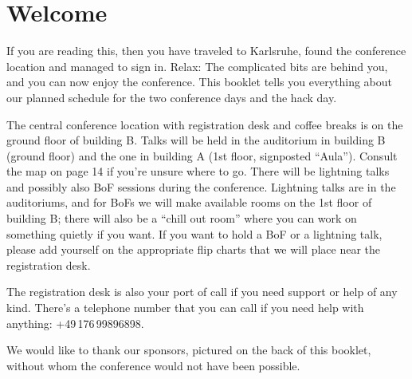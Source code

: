 \newpage
\section*{Welcome} \label{welcome}
\vspace{-0.4em}
If you are reading this, then you have traveled to
Karls\-ruhe, found the conference location and managed to
sign in. Relax: The complicated bits are behind you, and
you can now enjoy the conference.
This booklet tells you everything about our planned
schedule for the two conference days and the hack day.

The central conference location with registration desk and
coffee breaks is on the ground floor of building B. Talks will
be held in the auditorium in building B (ground floor) and
the one in building A (1st floor, signposted ``Aula'').
Consult the map on page 14 if you're unsure where to go.
There will be lightning talks and possibly also BoF sessions
during the conference. Lightning talks are in the
auditoriums, and for BoFs we will make available rooms on
the 1st floor of building B; there will also be a ``chill out
room'' where you can work on something quietly if you
want. If you want to hold a BoF or a lightning talk, please
add yourself on the appropriate flip charts that we will
place near the registration desk.

The registration desk is also your port of call if you need
support or help of any kind. There's a telephone number
that you can call if you need help with anything: 
+49\,176\,99896898.

We would like to thank our sponsors, pictured on the back
of this booklet, without whom the conference would not
have been possible.

